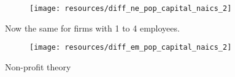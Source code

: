 \documentclass[12pt]{article}
\begin{document}
\begin{figure}[H]
	\centering
    \texttt{[image: resources/diff\_ne\_pop\_capital\_naics\_2]}
\end{figure}

Now the same for firms with 1 to 4 employees. 

\begin{figure}[H]
	\centering
    \texttt{[image: resources/diff\_em\_pop\_capital\_naics\_2]}
\end{figure}

\pagebreak

Non-profit theory

\pagebreak

\begin{comment}

Triple diff of industry state measurements

\pagebreak

Next steps: can possibly look at PUMS individual (ACS) data on employment to see if industries with that were greatly affected by health care had more employment

\end{comment}
\end{document}
